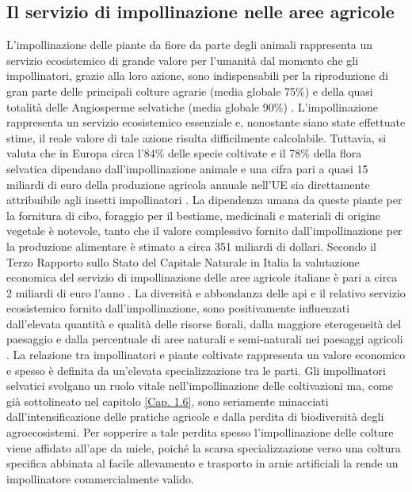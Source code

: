 \documentclass[main.tex]{subfiles}
\begin{document}
\subsection{Il servizio di impollinazione nelle aree agricole}

L'impollinazione delle piante da fiore da parte degli animali rappresenta un servizio ecosistemico di grande valore per l'umanità dal momento che gli impollinatori, grazie alla loro azione, sono indispensabili per la riproduzione di gran parte delle principali colture agrarie (media globale 75\%) e della quasi totalità delle Angiosperme selvatiche (media globale 90\%) \citep{bianco}.
L’impollinazione rappresenta un servizio ecosistemico essenziale e, nonostante siano state effettuate stime, il reale valore di tale azione risulta difficilmente calcolabile. Tuttavia, si valuta che in Europa circa l’84\% delle specie coltivate e il 78\% della flora selvatica dipendano dall’impollinazione animale e una cifra pari a quasi 15 miliardi di euro della produzione agricola annuale nell’UE sia direttamente attribuibile agli insetti impollinatori \citep{comeu}.
La dipendenza umana da queste piante per la fornitura di cibo, foraggio per il bestiame, medicinali e materiali di origine vegetale è notevole, tanto che il valore complessivo fornito dall’impollinazione per la produzione alimentare è stimato a circa 351 miliardi di dollari. Secondo il Terzo Rapporto sullo Stato del Capitale Naturale in Italia \citep{tr} la valutazione economica del servizio di impollinazione delle aree agricole italiane è pari a circa 2 miliardi di euro l’anno \citep{isp}.
La diversità e abbondanza delle api e il relativo servizio ecosistemico fornito dall’impollinazione, sono positivamente influenzati dall’elevata quantità e qualità delle risorse fiorali, dalla maggiore eterogeneità del paesaggio e dalla percentuale di aree naturali e semi-naturali nei paesaggi agricoli \citep{bianco}. La relazione tra impollinatori e piante coltivate rappresenta un valore economico e spesso è definita da un’elevata specializzazione tra le parti.
Gli impollinatori selvatici svolgano un ruolo vitale nell'impollinazione delle coltivazioni ma, come già sottolineato nel capitolo \ref{Cap. 1.6}, sono seriamente minacciati dall’intensificazione delle pratiche agricole e dalla perdita di biodiversità degli agroecosistemi. Per sopperire a tale perdita spesso l’impollinazione delle colture viene affidato all’ape da miele, poiché la scarsa specializzazione verso una coltura specifica abbinata al facile allevamento e trasporto in arnie artificiali la rende un impollinatore commercialmente valido.
\end{document}

